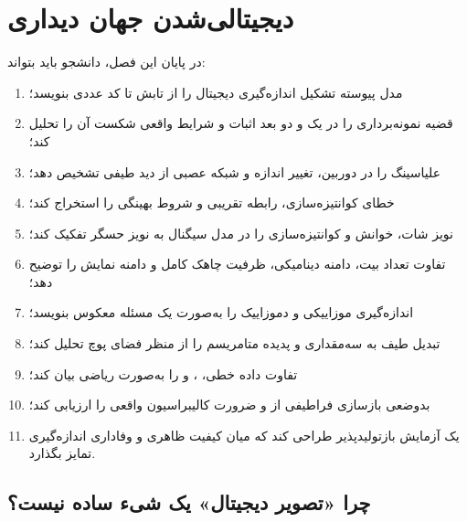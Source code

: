 \chapter{دیجیتالی‌شدن جهان دیداری}
\label{ch:digitization}

\begin{learningbox}
در پایان این فصل، دانشجو باید بتواند:
\begin{enumerate}
\item مدل پیوسته تشکیل اندازه‌گیری دیجیتال را از تابش تا کد عددی بنویسد؛
\item قضیه نمونه‌برداری را در یک و دو بعد اثبات و شرایط واقعی شکست آن را تحلیل کند؛
\item علیاسینگ را در دوربین، تغییر اندازه و شبکه عصبی از دید طیفی تشخیص دهد؛
\item خطای کوانتیزه‌سازی، رابطه تقریبی  و شروط بهینگی  را استخراج کند؛
\item نویز شات، خوانش و کوانتیزه‌سازی را در مدل سیگنال به نویز حسگر تفکیک کند؛
\item تفاوت تعداد بیت، دامنه دینامیکی، ظرفیت چاهک کامل و دامنه نمایش را توضیح دهد؛
\item اندازه‌گیری موزاییکی  و دموزاییک را به‌صورت یک مسئله معکوس بنویسد؛
\item تبدیل طیف به سه‌مقداری  و پدیده متامریسم را از منظر فضای پوچ تحلیل کند؛
\item تفاوت داده خطی، ،  و  را به‌صورت ریاضی بیان کند؛
\item بدوضعی بازسازی فراطیفی از  و ضرورت کالیبراسیون واقعی را ارزیابی کند؛
\item یک آزمایش بازتولیدپذیر طراحی کند که میان کیفیت ظاهری و وفاداری اندازه‌گیری تمایز بگذارد.
\end{enumerate}
\end{learningbox}

\section{چرا «تصویر دیجیتال» یک شیء ساده نیست؟}

